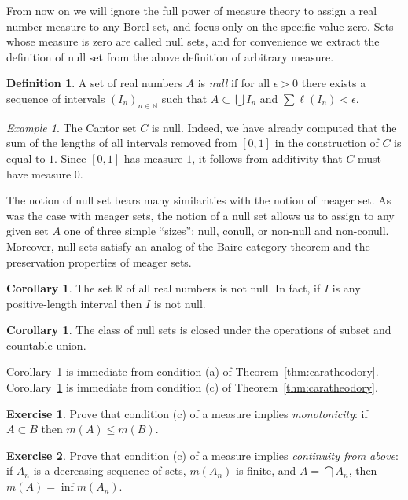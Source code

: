 \documentclass[11pt,oneside]{amsart}
\newcommand{\NN}{\mathbb N}
\newcommand{\RR}{\mathbb R}
\theoremstyle{definition}
\newtheorem{exerc}{Exercise}[section]
\newtheorem{cor}[thm]{Corollary}
\theoremstyle{definition}
\newtheorem{defn}[thm]{Definition}
\theoremstyle{remark}
\newtheorem{example}[thm]{Example}
\begin{document}
From now on we will ignore the full power of measure theory to assign a real number measure to any Borel set, and focus only on the specific value zero. Sets whose measure is zero are called null sets, and for convenience we extract the definition of null set from the above definition of arbitrary measure.

\begin{defn}
  \label{defn:null}
  A set of real numbers $A$ is \emph{null} if for all $\epsilon>0$ there exists a sequence of intervals $(I_n)_{n\in\NN}$ such that $A\subset\bigcup I_n$ and $\sum\ell(I_n)<\epsilon$.
\end{defn}

\begin{example}
  The Cantor set $C$ is null. Indeed, we have already computed that the sum of the lengths of all intervals removed from $[0,1]$ in the construction of $C$ is equal to $1$. Since $[0,1]$ has measure $1$, it follows from additivity that $C$ must have measure $0$.
\end{example}

The notion of null set bears many similarities with the notion of meager set. As was the case with meager sets, the notion of a null set allows us to assign to any given set $A$ one of three simple ``sizes'': null, conull, or non-null and non-conull. Moreover, null sets satisfy an analog of the Baire category theorem and the preservation properties of meager sets.

\begin{cor}
  \label{cor:interval-non-null}
  The set $\RR$ of all real numbers is not null. In fact, if $I$ is any positive-length interval then $I$ is not null.
\end{cor}

\begin{cor}
  \label{cor:null-pres}
  The class of null sets is closed under the operations of subset and countable union.
\end{cor}

Corollary~\ref{cor:interval-non-null} is immediate from condition (a) of Theorem~\ref{thm:caratheodory}. Corollary~\ref{cor:null-pres} is immediate from condition (c) of Theorem~\ref{thm:caratheodory}.

\begin{exerc}
  Prove that condition (c) of a measure implies \emph{monotonicity}: if $A\subset B$ then $m(A)\leq m(B)$.
\end{exerc}

\begin{exerc}
  Prove that condition (c) of a measure implies \emph{continuity from above}: if $A_n$ is a decreasing sequence of sets, $m(A_n)$ is finite, and $A=\bigcap A_n$, then $m(A)=\inf m(A_n)$.
\end{exerc}
\end{document}
